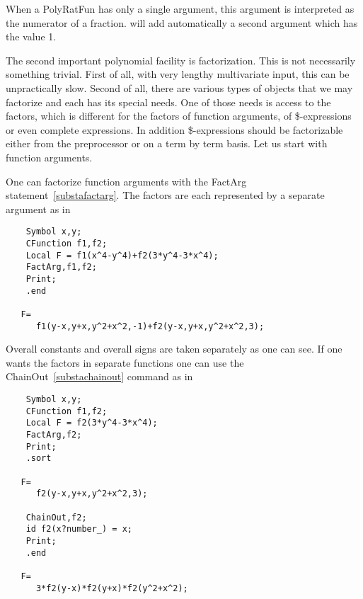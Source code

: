 \noindent When a PolyRatFun has only a single argument, this argument is 
interpreted as the numerator of a fraction. \FORM{} will add automatically a 
second argument which has the value 1.

\noindent The second important polynomial facility is factorization. This 
is not necessarily something trivial. First of all, with very lengthy 
multivariate input, this can be unpractically slow. Second of all, there 
are various types of objects that we may factorize and each has its special 
needs. One of those needs is access to the factors, which is different for 
the factors of function arguments, of \$-expressions or even complete 
expressions. In addition \$-expressions should be factorizable either from 
the preprocessor or on a term by term basis. Let us start with function 
arguments.

\noindent One can factorize function arguments with the FactArg 
statement~\ref{substafactarg}. The factors are each represented by a 
separate argument as in
\begin{verbatim}
    Symbol x,y;
    CFunction f1,f2;
    Local F = f1(x^4-y^4)+f2(3*y^4-3*x^4);
    FactArg,f1,f2;
    Print;
    .end

   F=
      f1(y-x,y+x,y^2+x^2,-1)+f2(y-x,y+x,y^2+x^2,3);
\end{verbatim}
Overall constants and overall signs are taken separately as one can see. If 
one wants the factors in separate functions one can use the 
ChainOut~\ref{substachainout} command as in
\begin{verbatim}
    Symbol x,y;
    CFunction f1,f2;
    Local F = f2(3*y^4-3*x^4);
    FactArg,f2;
    Print;
    .sort

   F=
      f2(y-x,y+x,y^2+x^2,3);

    ChainOut,f2;
    id f2(x?number_) = x;
    Print;
    .end

   F=
      3*f2(y-x)*f2(y+x)*f2(y^2+x^2);
\end{verbatim}

